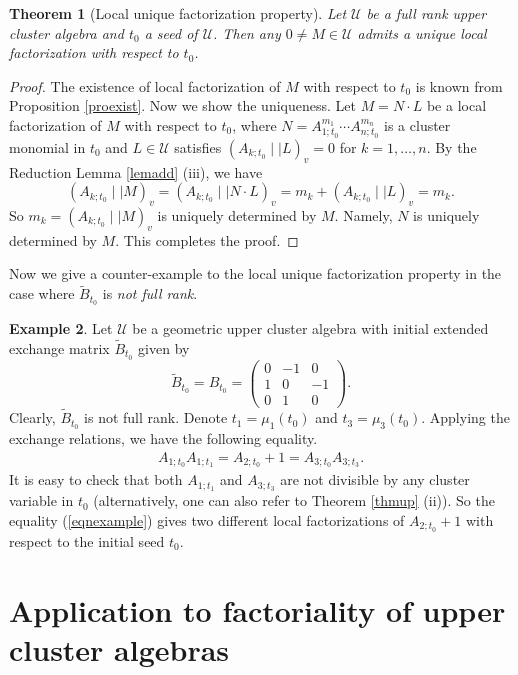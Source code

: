 \documentclass{amsart}
\newtheorem{theorem}{Theorem}[section]
\theoremstyle{definition}
\newtheorem{example}[theorem]{Example}
\theoremstyle{remark}
\numberwithin{equation}{section}
\begin{document}
\begin{theorem}[Local unique factorization property]\label{thmunique}
Let $\mathcal U$ be a full rank upper cluster algebra and $t_0$ a seed of $\mathcal U$. Then
  any $0\neq M\in\mathcal U$ admits a unique local factorization with respect to $t_0$.
\end{theorem}
\begin{proof}
The existence of local factorization of $M$ with respect to $t_0$ is known  from Proposition \ref{proexist}.
Now we show the uniqueness.
Let $M=N\cdot L$ be a  local factorization of $M$ with respect to $t_0$, where $N=A_{1;t_0}^{m_1}\cdots A_{n;t_0}^{m_n}$ is a cluster monomial in $t_0$ and $L\in\mathcal U$ satisfies $(A_{k;t_0}\mid\mid  L)_v=0$ for $k=1,\ldots,n$. By the Reduction Lemma \ref{lemadd} (iii), we have $$(A_{k;t_0}\mid\mid  M)_v=(A_{k;t_0}\mid\mid  N\cdot L)_v=m_k+(A_{k;t_0}\mid\mid  L)_v=m_k.$$
So $m_k=(A_{k;t_0}\mid\mid  M)_v$ is uniquely determined by $M$. Namely, $N$ is uniquely determined by $M$. This completes the proof.
\end{proof}
Now we give a counter-example to the local unique factorization property in the case where $\widetilde B_{t_0}$ is {\em not full rank}.

\begin{example}
Let $\mathcal U$ be a geometric upper cluster algebra with initial extended exchange matrix $\widetilde B_{t_0}$ given by $$\widetilde B_{t_0}= B_{t_0}=\begin{pmatrix}0&-1&0\\1&0&-1\\0&1&0\end{pmatrix}.$$
Clearly, $\widetilde B_{t_0}$ is not full rank.
Denote $t_1=\mu_1(t_0)$ and $t_3=\mu_3(t_0)$. Applying the exchange relations, we have the following equality.
\begin{eqnarray}\label{eqnexample}
A_{1;t_0}A_{1;t_1}=A_{2;t_0}+1=A_{3;t_0}A_{3;t_3}.
\end{eqnarray}
It is easy to check that both $A_{1;t_1}$ and $A_{3;t_3}$ are not divisible by any cluster variable in $t_0$ (alternatively, one can also refer to Theorem \ref{thmup} (ii)). So the equality (\ref{eqnexample}) gives two different local factorizations of $A_{2;t_0}+1$ with respect to the initial seed $t_0$.
\end{example}

\section{Application to factoriality of upper cluster algebras}\label{sec4}
\end{document}
